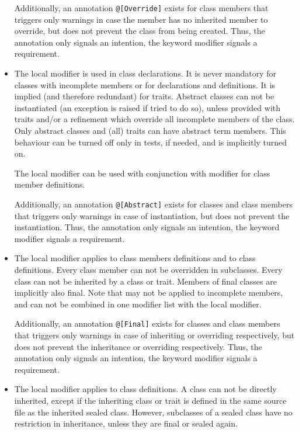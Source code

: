 \begin{itemize}
  Additionally, an annotation \lstinline!@[Override]! exists for class members that triggers only warnings in case the member has no inherited member to override, but does not prevent the class from being created. Thus, the annotation only signals an intention, the keyword modifier signals a requirement. 

  \item The  local modifier is used in class declarations. It is never mandatory for classes with incomplete members or for declarations and definitions. It is implied (and therefore redundant) for traits. Abstract classes can not be instantiated (an exception is raised if tried to do so), unless provided with traits and/or a refinement which override all incomplete members of the class. Only abstract classes and (all) traits can have abstract term members. This behaviour can be turned off only in tests, if needed, and is implicitly turned on. 

  The  local modifier can be used with conjunction with  modifier for class member definitions. 

  Additionally, an annotation \lstinline!@[Abstract]! exists for classes and class members that triggers only warnings in case of instantiation, but does not prevent the instantiation. Thus, the annotation only signals an intention, the keyword modifier signals a requirement. 

  \item The  local modifier applies to class members definitions and to class definitions. Every  class member can not be overridden in subclasses. Every  class can not be inherited by a class or trait. Members of final classes are implicitly also final. Note that  may not be applied to incomplete members, and can not be combined in one modifier list with the  local modifier. 

  Additionally, an annotation \lstinline!@[Final]! exists for classes and class members that triggers only warnings in case of inheriting or overriding respectively, but does not prevent the inheritance or overriding respectively. Thus, the annotation only signals an intention, the keyword modifier signals a requirement. 

  \item The  local modifier applies to class definitions. A  class can not be directly inherited, except if the inheriting class or trait is defined in the same source file as the inherited sealed class. However, subclasses of a sealed class have no restriction in inheritance, unless they are final or sealed again. 


\end{itemize}
